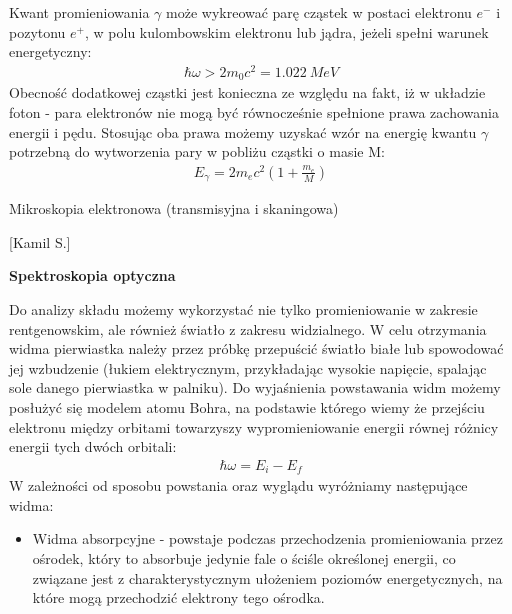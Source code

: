 \documentclass{article}
\begin{document}
\begin{enumerate}
Kwant promieniowania $\gamma$ może wykreować parę cząstek w postaci elektronu $e^-$ i pozytonu $e^+$, w polu kulombowskim elektronu lub jądra, jeżeli spełni warunek energetyczny:
 \begin{gather*}
\hbar\omega >2m_0c^2 = 1.022\ MeV
\end{gather*}
Obecność dodatkowej cząstki jest konieczna ze względu na fakt, iż w układzie foton - para elektronów nie mogą być równocześnie  spełnione prawa zachowania energii i pędu. Stosując oba prawa możemy uzyskać wzór na energię kwantu $\gamma$ potrzebną do wytworzenia pary w pobliżu cząstki o masie M:
 \begin{gather*}
E_{\gamma}=2m_ec^2\left ( 1+\frac{m_e}{M} \right )
\end{gather*}
\begin{center}
\end{center}
{\Large \bf  \item Mikroskopia elektronowa (transmisyjna i skaningowa)} [Kamil S.]


{\bf Spektroskopia optyczna}

Do analizy składu możemy wykorzystać nie tylko promieniowanie w zakresie rentgenowskim, ale również światło z zakresu widzialnego. W celu otrzymania widma pierwiastka należy przez próbkę przepuścić światło białe lub spowodować jej wzbudzenie (łukiem elektrycznym, przykładając wysokie napięcie, spalając sole danego pierwiastka w palniku). Do wyjaśnienia powstawania widm możemy posłużyć się modelem atomu Bohra, na podstawie którego wiemy  że przejściu elektronu między orbitami towarzyszy wypromieniowanie energii równej różnicy energii tych dwóch orbitali:
\begin{gather*}
\hbar\omega=E_i-E_f
\end{gather*}
W zależności od sposobu powstania oraz wyglądu wyróżniamy następujące widma:
\begin{itemize}
\item Widma absorpcyjne - powstaje podczas przechodzenia promieniowania przez ośrodek, który to absorbuje jedynie  fale o ściśle określonej energii, co związane jest z charakterystycznym ułożeniem poziomów energetycznych, na które mogą  przechodzić elektrony tego ośrodka.


\end{itemize}
\end{enumerate}
\end{document}
